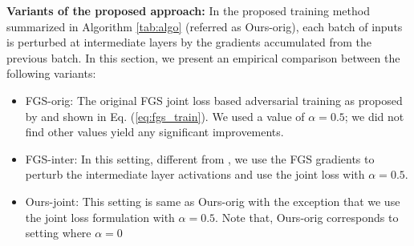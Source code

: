 \textbf{Variants of the proposed approach:}\label{subsec:variants} In the proposed training method summarized in Algorithm \ref{tab:algo} (referred as Ours-orig), each batch of inputs is perturbed at intermediate layers by the gradients accumulated from the previous batch. In this section, we present an empirical comparison between the following variants:
\begin{itemize}
\item FGS-orig: The original FGS joint loss based adversarial training as proposed by \cite{goodfellow2014explaining} and shown in Eq. (\ref{eq:fgs_train}). We used a value of $\alpha=0.5$; we did not find other values yield any significant improvements. %
\item FGS-inter: In this setting, different from \cite{goodfellow2014explaining}, we use the FGS gradients to perturb the intermediate layer activations and use the joint loss with $\alpha=0.5$.
\item Ours-joint: This setting is same as Ours-orig with the exception that we use the joint loss formulation with $\alpha=0.5$. Note that, Ours-orig corresponds to setting where $\alpha=0$
\end{itemize}
